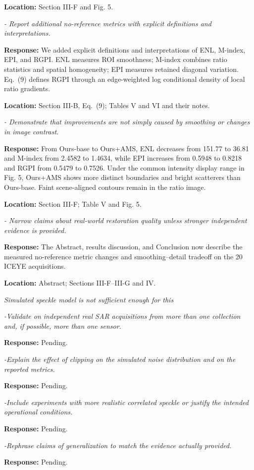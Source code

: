 \documentclass[11pt,letterpaper]{article}
\newcommand{\pendingbullet}[1]{%
  \Needspace{4\baselineskip}%
  \textit{#1}\par
  {\small\textbf{Response:} Pending.}\par
  \vspace{3pt}%
}
\newcommand{\reviewgroup}[1]{%
  \Needspace{5\baselineskip}%
  \medskip\textit{#1}\par
}
\begin{document}
\textbf{Location:} Section III-F and Fig. 5.

\textit{- Report additional no-reference metrics with explicit definitions and interpretations.}

\textbf{Response:} We added explicit definitions and interpretations of ENL, M-index, EPI, and RGPI. ENL measures ROI smoothness; M-index combines ratio statistics and spatial homogeneity; EPI measures retained diagonal variation. Eq.~(9) defines RGPI through an edge-weighted log conditional density of local ratio gradients.

\textbf{Location:} Section III-B, Eq.~(9); Tables V and VI and their notes.

\textit{- Demonstrate that improvements are not simply caused by smoothing or changes in image contrast.}

\textbf{Response:} From Ours-base to Ours+AMS, ENL decreases from 151.77 to 36.81 and M-index from 2.4582 to 1.4634, while EPI increases from 0.5948 to 0.8218 and RGPI from 0.5479 to 0.7526. Under the common intensity display range in Fig. 5, Ours+AMS shows more distinct boundaries and bright scatterers than Ours-base. Faint scene-aligned contours remain in the ratio image.

\textbf{Location:} Section III-F; Table V and Fig. 5.

\textit{- Narrow claims about real-world restoration quality unless stronger independent evidence is provided.}

\textbf{Response:} The Abstract, results discussion, and Conclusion now describe the measured no-reference metric changes and smoothing--detail tradeoff on the 20 ICEYE acquisitions.

\textbf{Location:} Abstract; Sections III-F--III-G and IV.

\reviewgroup{Simulated speckle model is not sufficient enough for this}

\pendingbullet{-Validate on independent real SAR acquisitions from more than one collection and, if possible, more than one sensor.}

\pendingbullet{-Explain the effect of clipping on the simulated noise distribution and on the reported metrics.}

\pendingbullet{-Include experiments with more realistic correlated speckle or justify the intended operational conditions.}

\pendingbullet{-Rephrase claims of generalization to match the evidence actually provided.}
\end{document}
